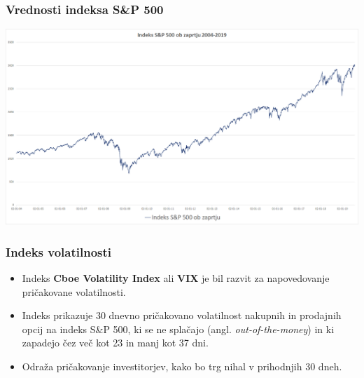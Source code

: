 \documentclass[10pt]{beamer}
\begin{document}
\begin{frame}
\frametitle{Vrednosti indeksa S\&P 500}
\includegraphics[width=1\textwidth]{./Grafi/SPX_2004-2019.png}
\end{frame}



\begin{frame}
\frametitle{Indeks volatilnosti}
\begin{itemize}
\item Indeks \textbf{Cboe Volatility Index} ali \textbf{VIX} je bil razvit za napovedovanje pričakovane volatilnosti.
\item Indeks prikazuje 30 dnevno pričakovano volatilnost nakupnih in prodajnih opcij na indeks S\&P 500, ki se ne splačajo (angl. \textit{out-of-the-money}) in ki zapadejo čez več kot 23 in manj kot 37 dni. 
\item Odraža pričakovanje investitorjev, kako bo trg nihal v prihodnjih 30 dneh.
\end{itemize}
\end{frame}
\end{document}
